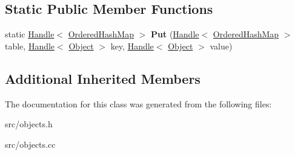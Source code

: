 \subsection*{Static Public Member Functions}
\begin{DoxyCompactItemize}
\item 
\hypertarget{classv8_1_1internal_1_1_ordered_hash_map_a2276ec1f4a685e16af88d8f4eece726d}{}static \hyperlink{classv8_1_1internal_1_1_handle}{Handle}$<$ \hyperlink{classv8_1_1internal_1_1_ordered_hash_map}{Ordered\+Hash\+Map} $>$ {\bfseries Put} (\hyperlink{classv8_1_1internal_1_1_handle}{Handle}$<$ \hyperlink{classv8_1_1internal_1_1_ordered_hash_map}{Ordered\+Hash\+Map} $>$ table, \hyperlink{classv8_1_1internal_1_1_handle}{Handle}$<$ \hyperlink{classv8_1_1internal_1_1_object}{Object} $>$ key, \hyperlink{classv8_1_1internal_1_1_handle}{Handle}$<$ \hyperlink{classv8_1_1internal_1_1_object}{Object} $>$ value)\label{classv8_1_1internal_1_1_ordered_hash_map_a2276ec1f4a685e16af88d8f4eece726d}

\end{DoxyCompactItemize}
\subsection*{Additional Inherited Members}


The documentation for this class was generated from the following files\+:\begin{DoxyCompactItemize}
\item 
src/objects.\+h\item 
src/objects.\+cc\end{DoxyCompactItemize}
